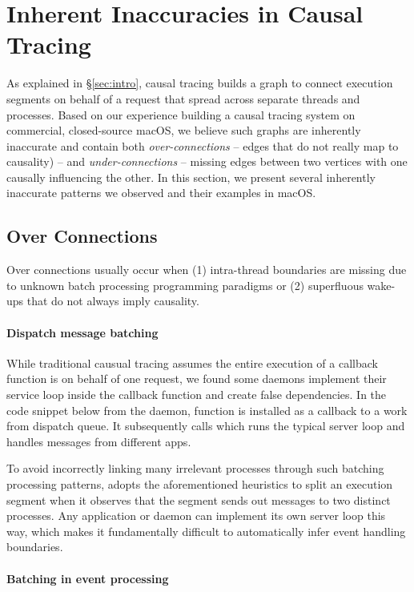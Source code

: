 \section{Inherent Inaccuracies in Causal Tracing}\label{sec:inaccuracy}

As explained in \S\ref{sec:intro}, causal tracing builds a graph to
connect execution segments on behalf of a request that spread across
separate threads and processes.  Based on our experience building a causal
tracing system on commercial, closed-source macOS, we believe such graphs
are inherently inaccurate and contain both \emph{over-connections} --
edges that do not really map to causality) -- and \emph{under-connections}
-- missing edges between two vertices with one causally influencing the
other.  In this section, we present several inherently inaccurate patterns
we observed and their examples in macOS.

\subsection{Over Connections}
Over connections usually occur when (1) intra-thread boundaries are
missing due to unknown batch processing programming paradigms or (2)
superfluous wake-ups that do not always imply causality.

\paragraph{Dispatch message batching}

While traditional causual tracing assumes the entire execution of a callback
function is on behalf of one request, we found some daemons implement their
service loop inside the callback function and create false dependencies. In the
code snippet below from the  daemon, function 
is installed as a callback to a work from dispatch queue. It subsequently calls
 which runs the typical server loop and handles
messages from different apps.

To avoid incorrectly linking many irrelevant processes through such batching
processing patterns, \xxx adopts the aforementioned heuristics to split an
execution segment when it observes that the segment sends out messages to two
distinct processes. Any application or daemon can implement its own server loop
this way, which makes it fundamentally difficult to automatically infer event
handling boundaries.

\paragraph{Batching in event processing}

